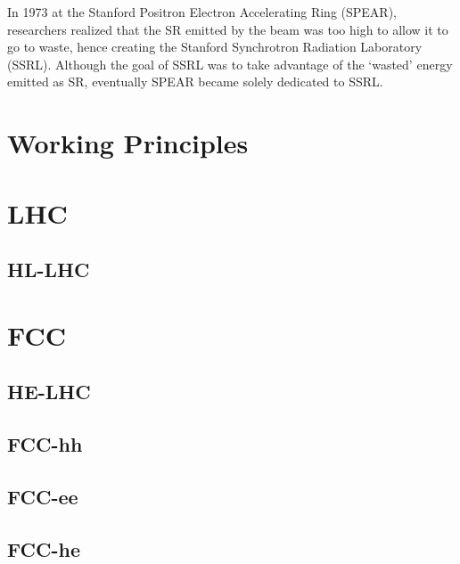 In 1973 at the Stanford Positron Electron Accelerating Ring (SPEAR), researchers
realized that the SR emitted by the beam was too high to allow it to go to
waste, hence creating the Stanford Synchrotron Radiation Laboratory
(SSRL). Although the goal of SSRL was to take advantage of the
`wasted' energy emitted as SR, eventually SPEAR became solely dedicated to SSRL.




\section{Working Principles}

\section{LHC}
\subsection{HL-LHC}
\section{FCC}
\subsection{HE-LHC}
\subsection{FCC-hh}
\subsection{FCC-ee}
\subsection{FCC-he}
